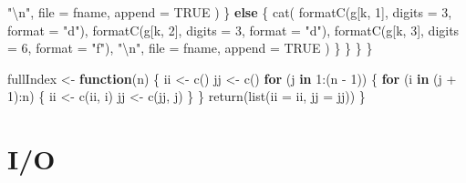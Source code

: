 \documentclass[
  12pt,
  letterpaper,
  DIV=11,
  numbers=noendperiod]{scrartcl}
\newenvironment{Shaded}{\begin{snugshade}}{\end{snugshade}}
\newcommand{\AttributeTok}[1]{\textcolor[rgb]{0.40,0.45,0.13}{#1}}
\newcommand{\ConstantTok}[1]{\textcolor[rgb]{0.56,0.35,0.01}{#1}}
\newcommand{\ControlFlowTok}[1]{\textcolor[rgb]{0.00,0.23,0.31}{\textbf{#1}}}
\newcommand{\DecValTok}[1]{\textcolor[rgb]{0.68,0.00,0.00}{#1}}
\newcommand{\FunctionTok}[1]{\textcolor[rgb]{0.28,0.35,0.67}{#1}}
\newcommand{\NormalTok}[1]{\textcolor[rgb]{0.00,0.23,0.31}{#1}}
\newcommand{\OtherTok}[1]{\textcolor[rgb]{0.00,0.23,0.31}{#1}}
\newcommand{\SpecialCharTok}[1]{\textcolor[rgb]{0.37,0.37,0.37}{#1}}
\newcommand{\StringTok}[1]{\textcolor[rgb]{0.13,0.47,0.30}{#1}}
\begin{document}
\begin{Shaded}
\begin{Highlighting}[]
            \StringTok{"}\SpecialCharTok{\textbackslash{}n}\StringTok{"}\NormalTok{,}
            \AttributeTok{file =}\NormalTok{ fname, }\AttributeTok{append =} \ConstantTok{TRUE}
\NormalTok{          )}
\NormalTok{        \} }\ControlFlowTok{else}\NormalTok{ \{}
          \FunctionTok{cat}\NormalTok{(}
            \FunctionTok{formatC}\NormalTok{(g[k, }\DecValTok{1}\NormalTok{], }\AttributeTok{digits =} \DecValTok{3}\NormalTok{, }\AttributeTok{format =} \StringTok{"d"}\NormalTok{),}
            \FunctionTok{formatC}\NormalTok{(g[k, }\DecValTok{2}\NormalTok{], }\AttributeTok{digits =} \DecValTok{3}\NormalTok{, }\AttributeTok{format =} \StringTok{"d"}\NormalTok{),}
            \FunctionTok{formatC}\NormalTok{(g[k, }\DecValTok{3}\NormalTok{], }\AttributeTok{digits =} \DecValTok{6}\NormalTok{, }\AttributeTok{format =} \StringTok{"f"}\NormalTok{),}
            \StringTok{"}\SpecialCharTok{\textbackslash{}n}\StringTok{"}\NormalTok{,}
            \AttributeTok{file =}\NormalTok{ fname, }\AttributeTok{append =} \ConstantTok{TRUE}
\NormalTok{          )}
\NormalTok{        \}}
\NormalTok{      \}}
\NormalTok{    \}}
\NormalTok{  \}}


\NormalTok{fullIndex }\OtherTok{\textless{}{-}} \ControlFlowTok{function}\NormalTok{(n) \{}
\NormalTok{  ii }\OtherTok{\textless{}{-}} \FunctionTok{c}\NormalTok{()}
\NormalTok{  jj }\OtherTok{\textless{}{-}} \FunctionTok{c}\NormalTok{()}
  \ControlFlowTok{for}\NormalTok{ (j }\ControlFlowTok{in} \DecValTok{1}\SpecialCharTok{:}\NormalTok{(n }\SpecialCharTok{{-}} \DecValTok{1}\NormalTok{)) \{}
    \ControlFlowTok{for}\NormalTok{ (i }\ControlFlowTok{in}\NormalTok{ (j }\SpecialCharTok{+} \DecValTok{1}\NormalTok{)}\SpecialCharTok{:}\NormalTok{n) \{}
\NormalTok{      ii }\OtherTok{\textless{}{-}} \FunctionTok{c}\NormalTok{(ii, i)}
\NormalTok{      jj }\OtherTok{\textless{}{-}} \FunctionTok{c}\NormalTok{(jj, j)}
\NormalTok{    \}}
\NormalTok{  \}}
  \FunctionTok{return}\NormalTok{(}\FunctionTok{list}\NormalTok{(}\AttributeTok{ii =}\NormalTok{ ii, }\AttributeTok{jj =}\NormalTok{ jj))}
\NormalTok{\}}
\end{Highlighting}
\end{Shaded}

\section{I/O}\label{io}
\end{document}
